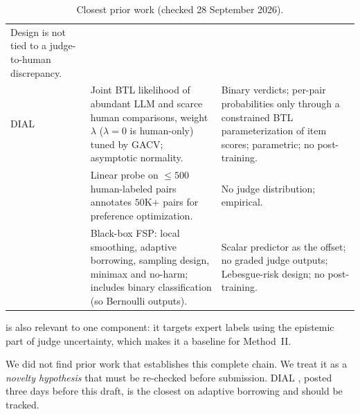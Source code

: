 \begin{table}[h]
\begin{tabularx}{\linewidth}{@{}p{3.1cm}XX@{}}
Design is not tied to a judge-to-human discrepancy. \\
DIAL \newline \citep{cai2026dial} &
Joint BTL likelihood of abundant LLM and scarce human comparisons, weight $\lambda$ ($\lambda=0$ is
human-only) tuned by GACV; asymptotic normality. &
Binary verdicts; per-pair probabilities only through a constrained BTL parameterization of item
scores; parametric; no post-training. \\
\citet{galatolo2026lowresource} &
Linear probe on $\le 500$ human-labeled pairs annotates $50$K$+$ pairs for preference optimization. &
No judge distribution; empirical. \\
\citet{li2026personalizing} &
Black-box FSP: local smoothing, adaptive borrowing, sampling design, minimax and no-harm; includes
binary classification (so Bernoulli outputs). &
Scalar predictor as the offset; no graded judge outputs; Lebesgue-risk design; no post-training. \\
\bottomrule
\end{tabularx}
\caption{Closest prior work (checked 28 September 2026).}
\label{tab:positioning}
\end{table}

\citet{lail2026decomposing} is also relevant to one component: it targets expert labels using the
epistemic part of judge uncertainty, which makes it a baseline for Method~II.


We did not find prior work that establishes this complete chain. We treat it as a
\emph{novelty hypothesis} that must be re-checked before submission. DIAL \citep{cai2026dial},
posted three days before this draft, is the closest on adaptive borrowing and should be
tracked.

